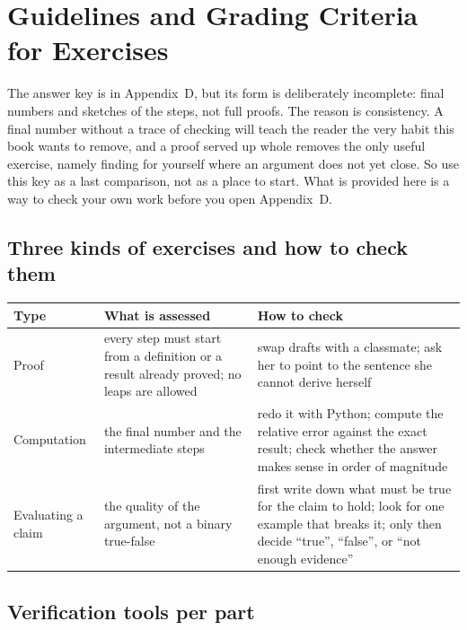 \chapter{Guidelines and Grading Criteria for Exercises}
\label{app:petunjuk}

The answer key is in Appendix~D, but its form is deliberately incomplete: final numbers
and sketches of the steps, not full proofs. The reason is consistency. A final number
without a trace of checking will teach the reader the very habit this book wants to
remove, and a proof served up whole removes the only useful exercise, namely finding for
yourself where an argument does not yet close. So use this key as a last comparison, not
as a place to start. What is provided here is a way to check your own work before you
open Appendix~D.

\section*{Three kinds of exercises and how to check them}

\begin{center}
\small
\begin{tabular}{@{}p{2.6cm}p{5.6cm}p{5.8cm}@{}}
\toprule
\textbf{Type} & \textbf{What is assessed} & \textbf{How to check} \\
\midrule
Proof & every step must start from a definition or a result already
  proved; no leaps are allowed & swap drafts with a classmate; ask her
  to point to the sentence she cannot derive herself \\
Computation & the final number and the intermediate steps & redo it with Python; compute the relative
  error against the exact result; check whether the answer makes sense in
  order of magnitude \\
Evaluating a claim & the quality of the argument, not a binary true-false & first write down what
  must be true for the claim to hold; look for one example that breaks it;
  only then decide ``true'', ``false'', or ``not enough evidence'' \\
\bottomrule
\end{tabular}
\end{center}

\section*{Verification tools per part}

